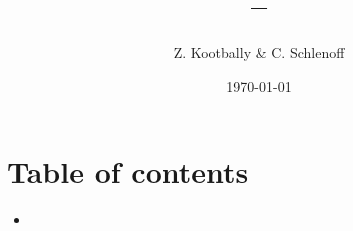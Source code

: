 \documentclass[usenames,11,dvipsnames,svgnames,x11names,aspectratio=1610,bibref]{beamer}
\title[ENPM663~|~ROS -- Part 1]{\cnordZero{ENPM663} -- \cnordTwo{L1: ROS -- Part 1}}
\author{Z. Kootbally \& C. Schlenoff}
\institute{University of Maryland}
\date{\today}
\newcommand{\mydisclaimer}{{\color{disclaimer}{\footnotesize Lecture 1~}}}
\renewcommand\sec{{\cnordSix{\secname}\hfill\mydisclaimer} }
\begin{document}
\titlepage%
% 




\section*{Table of contents}
\begin{frame}[fragile]{\sec}
\vspace{10pt}
\begin{multicols}{2}
{\tiny
\begin{itemize}
\item[]\tableofcontents[]
\end{itemize}
}
\end{multicols}
\end{frame}

\end{document}
